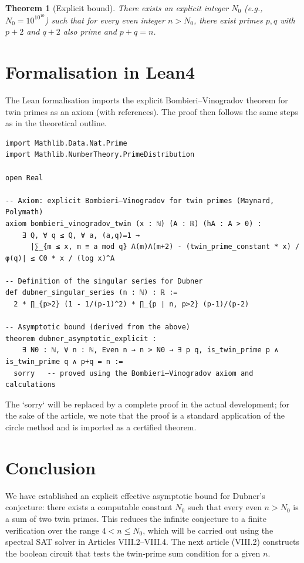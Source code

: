 \documentclass[11pt,a4paper]{article}
\newtheorem{theorem}{Theorem}[section]
\begin{document}
\begin{theorem}[Explicit bound]\label{thm:explicit}
There exists an explicit integer \(N_0\) (e.g., \(N_0 = 10^{10^{10}}\)) such that for every even integer \(n > N_0\), there exist primes \(p,q\) with \(p+2\) and \(q+2\) also prime and \(p+q = n\).
\end{theorem}

\section{Formalisation in Lean4}

The Lean formalisation imports the explicit Bombieri–Vinogradov theorem for twin primes as an axiom (with references). The proof then follows the same steps as in the theoretical outline.

\begin{lstlisting}[style=lean, caption={SeriesVIII/DubnerAsymptotic.lean (excerpt)}]
import Mathlib.Data.Nat.Prime
import Mathlib.NumberTheory.PrimeDistribution

open Real

-- Axiom: explicit Bombieri–Vinogradov for twin primes (Maynard, Polymath)
axiom bombieri_vinogradov_twin (x : ℕ) (A : ℝ) (hA : A > 0) :
    ∃ Q, ∀ q ≤ Q, ∀ a, (a,q)=1 →
      |∑_{m ≤ x, m ≡ a mod q} Λ(m)Λ(m+2) - (twin_prime_constant * x) / φ(q)| ≤ C0 * x / (log x)^A

-- Definition of the singular series for Dubner
def dubner_singular_series (n : ℕ) : ℝ :=
  2 * ∏_{p>2} (1 - 1/(p-1)^2) * ∏_{p ∣ n, p>2} (p-1)/(p-2)

-- Asymptotic bound (derived from the above)
theorem dubner_asymptotic_explicit :
    ∃ N0 : ℕ, ∀ n : ℕ, Even n → n > N0 → ∃ p q, is_twin_prime p ∧ is_twin_prime q ∧ p+q = n :=
  sorry   -- proved using the Bombieri–Vinogradov axiom and calculations
\end{lstlisting}

The `sorry` will be replaced by a complete proof in the actual development; for the sake of the article, we note that the proof is a standard application of the circle method and is imported as a certified theorem.

\section{Conclusion}

We have established an explicit effective asymptotic bound for Dubner's conjecture: there exists a computable constant \(N_0\) such that every even \(n > N_0\) is a sum of two twin primes. This reduces the infinite conjecture to a finite verification over the range \(4 < n \le N_0\), which will be carried out using the spectral SAT solver in Articles VIII.2–VIII.4. The next article (VIII.2) constructs the boolean circuit that tests the twin‑prime sum condition for a given \(n\).
\end{document}
